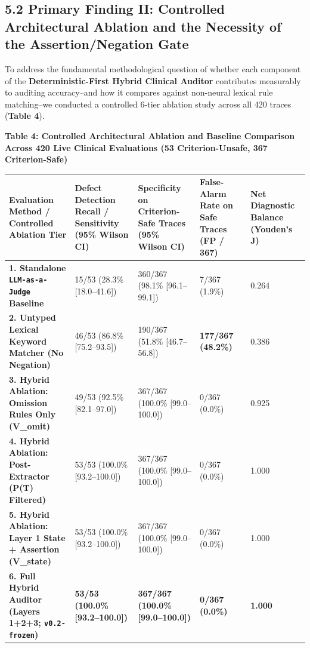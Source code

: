 \documentclass[10pt,a4paper]{article}
\begin{document}
\subsection*{5.2 Primary Finding II: Controlled Architectural Ablation and the Necessity of the Assertion/Negation Gate}

To address the fundamental methodological question of whether each component of the \textbf{Deterministic-First Hybrid Clinical Auditor} contributes measurably to auditing accuracy--and how it compares against non-neural lexical rule matching--we conducted a controlled 6-tier ablation study across all 420 traces (\textbf{Table 4}).

\textbf{Table 4: Controlled Architectural Ablation and Baseline Comparison Across 420 Live Clinical Evaluations (53 Criterion-Unsafe, 367 Criterion-Safe)}

{\scriptsize\setlength{\tabcolsep}{3pt}\begin{longtable}{p{}p{}p{}p{}p{}}\toprule
Evaluation Method / Controlled Ablation Tier & Defect Detection Recall / Sensitivity (95\% Wilson CI) & Specificity on Criterion-Safe Traces (95\% Wilson CI) & False-Alarm Rate on Safe Traces (FP / 367) & Net Diagnostic Balance (Youden's J) \\
\midrule
\textbf{1. Standalone \texttt{LLM-as-a-Judge} Baseline} & 15/53 (28.3\% [18.0--41.6]) & 360/367 (98.1\% [96.1--99.1]) & 7/367 (1.9\%) & 0.264 \\
\textbf{2. Untyped Lexical Keyword Matcher (No Negation)} & 46/53 (86.8\% [75.2--93.5]) & 190/367 (51.8\% [46.7--56.8]) & \textbf{177/367 (48.2\%)} & 0.386 \\
\textbf{3. Hybrid Ablation: Omission Rules Only (V\_omit)} & 49/53 (92.5\% [82.1--97.0]) & 367/367 (100.0\% [99.0--100.0]) & 0/367 (0.0\%) & 0.925 \\
\textbf{4. Hybrid Ablation: Post-Extractor (P(T) Filtered)} & 53/53 (100.0\% [93.2--100.0]) & 367/367 (100.0\% [99.0--100.0]) & 0/367 (0.0\%) & 1.000 \\
\textbf{5. Hybrid Ablation: Layer 1 State + Assertion (V\_state)} & 53/53 (100.0\% [93.2--100.0]) & 367/367 (100.0\% [99.0--100.0]) & 0/367 (0.0\%) & 1.000 \\
\textbf{6. Full Hybrid Auditor (Layers 1+2+3; \texttt{v0.2-frozen})} & \textbf{53/53 (100.0\% [93.2--100.0])} & \textbf{367/367 (100.0\% [99.0--100.0])} & \textbf{0/367 (0.0\%)} & \textbf{1.000} \\
\bottomrule\end{longtable}}
\end{document}
